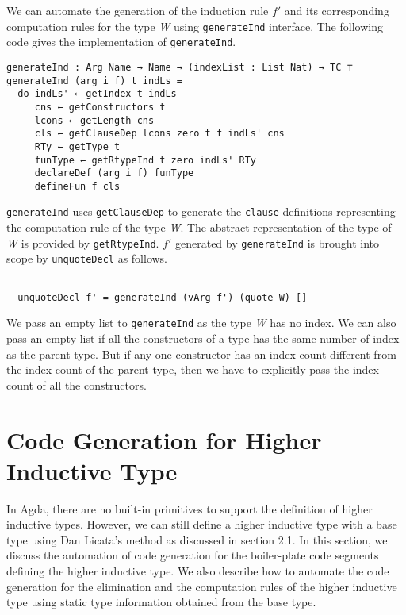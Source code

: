 \documentclass[sigplan,10pt]{acmart}
\begin{document}
We can automate the generation of the induction rule $f'$ and its corresponding computation rules for the type \emph{W} using {\tt generateInd} interface. The following code gives the implementation of {\tt generateInd}.

\begin{center}
\begingroup
\fontsize{7pt}{9pt}\selectfont
\begin{Verbatim}
generateInd : Arg Name → Name → (indexList : List Nat) → TC ⊤
generateInd (arg i f) t indLs =
  do indLs' ← getIndex t indLs
     cns ← getConstructors t
     lcons ← getLength cns
     cls ← getClauseDep lcons zero t f indLs' cns
     RTy ← getType t
     funType ← getRtypeInd t zero indLs' RTy
     declareDef (arg i f) funType
     defineFun f cls
\end{Verbatim}
\endgroup
\end{center}

\normalsize

{\tt generateInd} uses {\tt getClauseDep} to generate the {\tt clause} definitions representing the computation rule of the type \emph{W}. The abstract representation of the type of \emph{W} is provided by {\tt getRtypeInd}. $f'$ generated by {\tt generateInd} is brought into scope by {\tt unquoteDecl} as follows.
\begin{center}
\begingroup
\fontsize{8pt}{9pt}\selectfont
\begin{Verbatim}

  unquoteDecl f' = generateInd (vArg f') (quote W) []

\end{Verbatim}
\endgroup
\end{center}
\normalsize

We pass an empty list to {\tt generateInd} as the type \emph{W} has no index. We can also pass an empty list if all the constructors of a type has the same number of index as the parent type. But if any one constructor has an index count different from the index count of the parent type, then we have to explicitly pass the index count of all the constructors.

\section{Code Generation for Higher Inductive Type}
\label{sec:sec4}

In Agda, there are no built-in primitives to support the definition of higher inductive types. However, we can still define a higher inductive type with a base type using Dan Licata's \citep{Licata-2011} method as discussed in section 2.1. In this section, we discuss the automation of code generation for the boiler-plate code segments defining the higher inductive type. We also describe how to automate the code generation for the elimination and the computation rules of the higher inductive type using static type information obtained from the base type.
\end{document}
